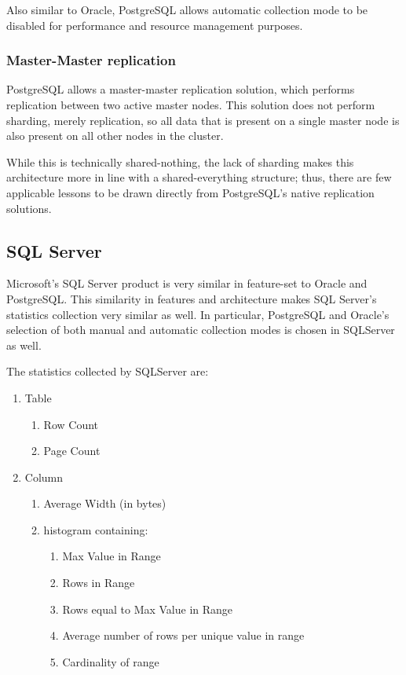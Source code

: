 Also similar to Oracle, PostgreSQL allows automatic collection mode to be disabled for performance and resource management purposes.

\subsubsection{Master-Master replication}
PostgreSQL allows a master-master replication solution, which performs replication between two active master nodes\cite{PGReplication}. This solution does not perform sharding, merely replication, so all data that is present on a single master node is also present on all other nodes in the cluster. 

While this is technically shared-nothing, the lack of sharding makes this architecture more in line with a shared-everything structure; thus, there are few applicable lessons to be drawn directly from PostgreSQL's native replication solutions.

\subsection{SQL Server}
Microsoft's SQL Server product is very similar in feature-set to Oracle and PostgreSQL. This similarity in features and architecture makes SQL Server's statistics collection very similar as well. In particular, PostgreSQL and Oracle's selection of both manual and automatic collection modes is chosen in SQLServer as well.

The statistics collected by SQLServer are\cite{SQLServerStats}:

\begin{enumerate}
	\item Table
					\begin{enumerate}
									\item Row Count
									\item Page Count
					\end{enumerate}
	\item Column
					\begin{enumerate}
									\item Average Width (in bytes)
									\item histogram containing:
													\begin{enumerate}
																	\item Max Value in Range
																	\item Rows in Range
																	\item Rows equal to Max Value in Range
																	\item Average number of rows per unique value in range
																	\item Cardinality of range
													\end{enumerate}
					\end{enumerate}
\end{enumerate}

